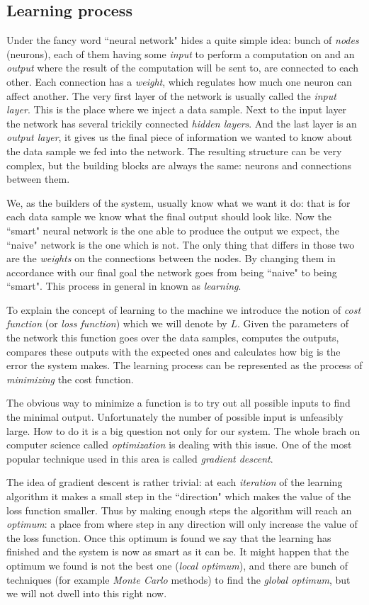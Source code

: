 \documentclass[a4paper,12pt]{article}
\begin{document}
\subsection{Learning process}
Under the fancy word ``neural network" hides a quite simple idea: bunch of \emph{nodes} (neurons), each of them having some \emph{input} to perform a computation on and an \emph{output} where the result of the computation will be sent to, are connected to each other. Each connection has a \emph{weight}, which regulates how much one neuron can affect another. The very first layer of the network is usually called the \emph{input layer}. This is the place where we inject a data sample. Next to the input layer the network has several trickily connected \emph{hidden layers}. And the last layer is an \emph{output layer}, it gives us the final piece of information we wanted to know about the data sample we fed into the network. The resulting structure can be very complex, but the building blocks are always the same: neurons and connections between them.

We, as the builders of the system, usually know what we want it do: that is for each data sample we know what the final output should look like. Now the ``smart" neural network is the one able to produce the output we expect, the ``naive" network is the one which is not. The only thing that differs in those two are the \emph{weights} on the connections between the nodes. By changing them in accordance with our final goal the network goes from being ``naive" to being ``smart". This process in general in known as \emph{learning}.

To explain the concept of learning to the machine we introduce the notion of \emph{cost function} (or \emph{loss function}) which we will denote by $L$. Given the parameters of the network this function goes over the data samples, computes the outputs, compares these outputs with the expected ones and calculates how big is the error the system makes. The learning process can be represented as the process of \emph{minimizing} the cost function.

The obvious way to minimize a function is to try out all possible inputs to find the minimal output. Unfortunately the number of possible input is unfeasibly large. How to do it is a big question not only for our system. The whole brach on computer science called \emph{optimization} is dealing with this issue. One of the most popular technique used in this area is called \emph{gradient descent}.

The idea of gradient descent is rather trivial: at each \emph{iteration} of the learning algorithm it makes a small step in the ``direction" which makes the value of the loss function smaller. Thus by making enough steps the algorithm will reach an \emph{optimum}: a place from where step in any direction will only increase the value of the loss function. Once this optimum is found we say that the learning has finished and the system is now as smart as it can be. It might happen that the optimum we found is not the best one (\emph{local optimum}), and there are bunch of techniques (for example \emph{Monte Carlo} methods) to find the \emph{global optimum}, but we will not dwell into this right now. 
\end{document}
